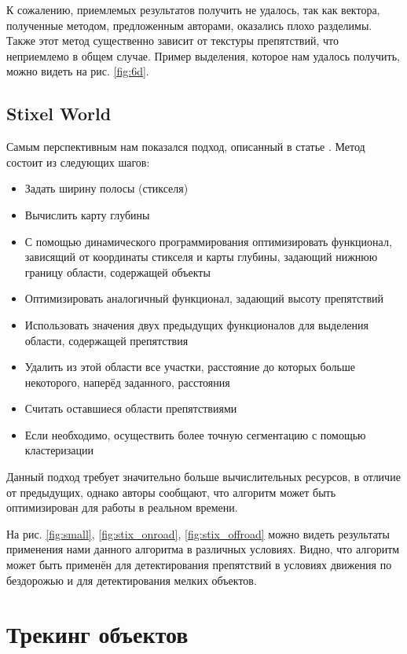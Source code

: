 \documentclass[aps,%
14pt,%
final,%
oneside,
onecolumn,%
musixtex, %
superscriptaddress,%
centertags]{extarticle} %
\begin{document}
К сожалению, приемлемых результатов получить не удалось, так как вектора, полученные методом, предложенным авторами, оказались плохо разделимы. Также этот метод существенно зависит от текстуры препятствий, что неприемлемо в общем случае. Пример выделения, которое нам удалось получить, можно видеть на рис. \ref{fig:6d}.

\subsection{ Stixel World }

Самым перспективным нам показался подход, описанный в статье \cite{pfeiffer2010efficient}. Метод состоит из следующих шагов:

\begin{itemize}
     \item Задать ширину полосы (стикселя)
     \item Вычислить карту глубины
     \item С помощью динамического программирования оптимизировать функционал, зависящий от координаты стикселя и карты глубины, задающий нижнюю границу области, содержащей объекты
     \item Оптимизировать аналогичный функционал, задающий высоту препятствий
     \item Использовать значения двух предыдущих функционалов для выделения области, содержащей препятствия
     \item Удалить из этой области все участки, расстояние до которых больше некоторого, наперёд заданного, расстояния
    \item Считать оставшиеся области препятствиями
    \item Если необходимо, осуществить более точную сегментацию с помощью кластеризации
\end{itemize}

Данный подход требует значительно больше вычислительных ресурсов, в отличие от предыдущих, однако авторы \cite{benenson2011stixels} сообщают, что алгоритм может быть оптимизирован для работы в реальном времени.

На рис. \ref{fig:small}, \ref{fig:stix_onroad}, \ref{fig:stix_offroad} можно видеть результаты применения нами данного алгоритма в различных условиях. Видно, что алгоритм может быть применён для детектирования препятствий в условиях движения по бездорожью и для детектирования мелких объектов.

\section{Трекинг объектов}
\end{document}
